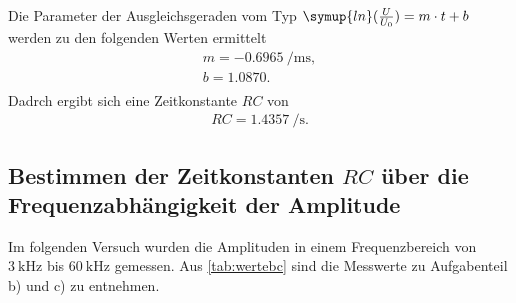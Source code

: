 Die Parameter der Ausgleichsgeraden vom Typ $\symup{ln}(\frac{U}{U_{0}}) = m \cdot t + b$ werden zu den folgenden Werten ermittelt
\begin{align*}
    m = \SI{-0.6965}{\per\milli\second}, \\
    b = 1.0870. \\
\end{align*}
Dadrch ergibt sich eine Zeitkonstante $RC$ von 
\begin{align*}
    RC = \SI{1.4357}{\per\second}.
\end{align*}



\subsection{Bestimmen der Zeitkonstanten $RC$ über die Frequenzabhängigkeit der Amplitude}
Im folgenden Versuch wurden die Amplituden in einem Frequenzbereich von $\SI{3}{\kilo\hertz}$ bis $\SI{60}{\kilo\hertz}$ gemessen.
Aus \autoref{tab:wertebc} sind die Messwerte zu Aufgabenteil b) und c) zu entnehmen.
